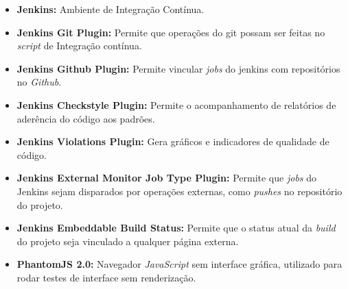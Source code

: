 \begin{apendicesenv}
\begin{itemize}
	\item \textbf{Jenkins:}	Ambiente de Integração Contínua. 
	\item \textbf{Jenkins Git Plugin:}	Permite que operações do git possam ser feitas no \textit{script} de Integração contínua.
	\item \textbf{Jenkins Github Plugin:}	Permite vincular \textit{jobs} do jenkins com repositórios no \textit{Github}.
	\item \textbf{Jenkins Checkstyle Plugin:} Permite o acompanhamento de relatórios de aderência do código aos padrões.
	\item \textbf{Jenkins Violations Plugin:} Gera gráficos e indicadores de qualidade de código.
	\item \textbf{Jenkins External Monitor Job Type Plugin:} Permite que \textit{jobs} do Jenkins sejam disparados por operações externas, como \textit{pushes} no repositório do projeto.
	\item \textbf{Jenkins Embeddable Build Status:} Permite que o status atual da \textit{build} do projeto seja vinculado a qualquer página externa.  
	\item \textbf{PhantomJS 2.0:} Navegador \textit{JavaScript} sem interface gráfica, utilizado para rodar testes de interface sem renderização.
\end{itemize}

\end{apendicesenv}
